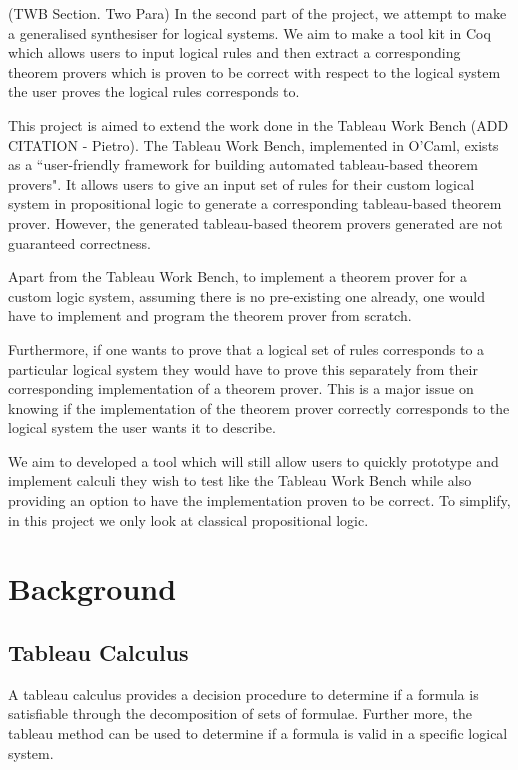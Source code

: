 \documentclass{report}
\theoremstyle{definition}
\begin{document}
(TWB Section. Two Para)
In the second part of the project, we attempt to make a generalised synthesiser
for logical systems. We aim to make a tool kit in Coq which allows users to
input logical rules and then extract a corresponding theorem provers which is
proven to be correct with respect to the logical system the user proves the
logical rules corresponds to.

This project is aimed to extend the work done in the Tableau Work Bench
(ADD CITATION - Pietro). The Tableau Work Bench, implemented in O'Caml, exists
as a ``user-friendly framework for building automated tableau-based theorem
provers". It allows users to give an input set of rules for their custom
logical system in propositional logic to generate a corresponding tableau-based
theorem prover. However, the generated tableau-based theorem provers generated
are not guaranteed correctness.

Apart from the Tableau Work Bench, to implement a theorem prover for a custom
logic system, assuming there is no pre-existing one already, one would have to
implement and program the theorem prover from scratch.

Furthermore, if one wants to prove that a logical set of rules corresponds to
a particular logical system they would have to prove this separately from their
corresponding implementation of a theorem prover. This is a major issue on
knowing if the implementation of the theorem prover correctly corresponds to
the logical system the user wants it to describe.

We aim to developed a tool which will still allow users to quickly prototype
and implement calculi they wish to test like the Tableau Work Bench while also
providing an option to have the implementation proven to be correct.
To simplify, in this project we only look at classical propositional logic.

\section{Background}

\subsection{Tableau Calculus}

A tableau calculus provides a decision procedure to determine if a formula
is satisfiable through the decomposition of sets of formulae. Further more,
the tableau method can be used to determine if a formula is valid in a specific
logical system.
\end{document}
